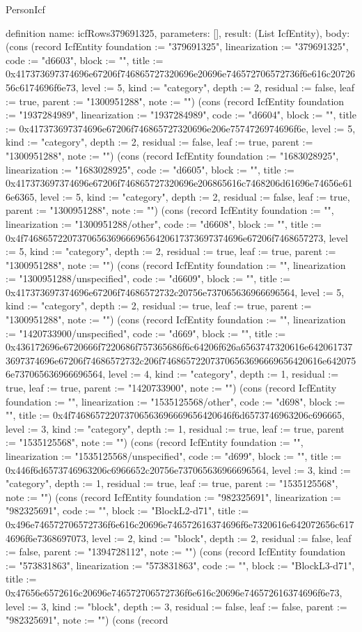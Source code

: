 \begin{lexlean}{PersonIcf}
\begin{semanticmodule}
definition{
  name: icfRows379691325,
  parameters: [],
  result: (List IcfEntity),
  body: (cons (record IcfEntity {foundation := "379691325", linearization := "379691325", code := "d6603", block := "", title := 0x417373697374696e67206f746865727320696e20696e746572706572736f6e616c2072656c6174696f6e73, level := 5, kind := "category", depth := 2, residual := false, leaf := true, parent := "1300951288", note := ""}) (cons (record IcfEntity {foundation := "1937284989", linearization := "1937284989", code := "d6604", block := "", title := 0x417373697374696e67206f746865727320696e206e7574726974696f6e, level := 5, kind := "category", depth := 2, residual := false, leaf := true, parent := "1300951288", note := ""}) (cons (record IcfEntity {foundation := "1683028925", linearization := "1683028925", code := "d6605", block := "", title := 0x417373697374696e67206f746865727320696e206865616c7468206d61696e74656e616e6365, level := 5, kind := "category", depth := 2, residual := false, leaf := true, parent := "1300951288", note := ""}) (cons (record IcfEntity {foundation := "", linearization := "1300951288/other", code := "d6608", block := "", title := 0x4f746865722073706563696669656420617373697374696e67206f7468657273, level := 5, kind := "category", depth := 2, residual := true, leaf := true, parent := "1300951288", note := ""}) (cons (record IcfEntity {foundation := "", linearization := "1300951288/unspecified", code := "d6609", block := "", title := 0x417373697374696e67206f74686572732c20756e737065636966696564, level := 5, kind := "category", depth := 2, residual := true, leaf := true, parent := "1300951288", note := ""}) (cons (record IcfEntity {foundation := "", linearization := "1420733900/unspecified", code := "d669", block := "", title := 0x436172696e6720666f7220686f757365686f6c64206f626a6563747320616e6420617373697374696e67206f74686572732c206f746865722073706563696669656420616e6420756e737065636966696564, level := 4, kind := "category", depth := 1, residual := true, leaf := true, parent := "1420733900", note := ""}) (cons (record IcfEntity {foundation := "", linearization := "1535125568/other", code := "d698", block := "", title := 0x4f746865722073706563696669656420646f6d6573746963206c696665, level := 3, kind := "category", depth := 1, residual := true, leaf := true, parent := "1535125568", note := ""}) (cons (record IcfEntity {foundation := "", linearization := "1535125568/unspecified", code := "d699", block := "", title := 0x446f6d6573746963206c6966652c20756e737065636966696564, level := 3, kind := "category", depth := 1, residual := true, leaf := true, parent := "1535125568", note := ""}) (cons (record IcfEntity {foundation := "982325691", linearization := "982325691", code := "", block := "BlockL2-d71", title := 0x496e746572706572736f6e616c20696e746572616374696f6e7320616e642072656c6174696f6e7368697073, level := 2, kind := "block", depth := 2, residual := false, leaf := false, parent := "1394728112", note := ""}) (cons (record IcfEntity {foundation := "573831863", linearization := "573831863", code := "", block := "BlockL3-d71", title := 0x47656e6572616c20696e746572706572736f6e616c20696e746572616374696f6e73, level := 3, kind := "block", depth := 3, residual := false, leaf := false, parent := "982325691", note := ""}) (cons (record }
\end{semanticmodule}
\end{lexlean}
